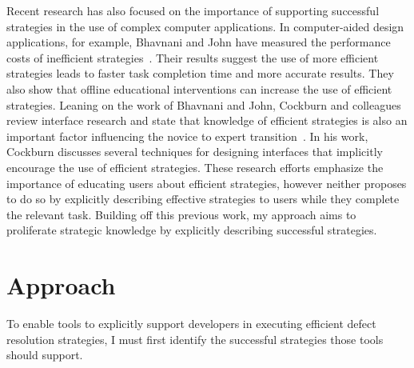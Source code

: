 \documentclass{sig-alternate}
\begin{document}
Recent research has also focused on the importance of supporting successful strategies in the use of complex computer applications.
In computer-aided design applications, for example, Bhavnani and John have measured the performance costs of inefficient strategies~\cite{Bhavnani2000}.
Their results suggest the use of more efficient strategies leads to faster task completion time and more accurate results.
They also show that offline educational interventions can increase the use of efficient strategies.
Leaning on the work of Bhavnani and John, Cockburn and colleagues review interface research and state that knowledge of efficient strategies is also an important factor influencing the novice to expert transition~\cite{Cockburn2014}.
In his work, Cockburn discusses several techniques for designing interfaces that implicitly encourage the use of efficient strategies.
These research efforts emphasize the importance of educating users about efficient strategies, however neither proposes to do so by explicitly describing effective strategies to users while they complete the relevant task.
Building off this previous work, my approach aims to proliferate strategic knowledge by explicitly describing successful strategies. 








 
 



\section{Approach}
\label{sec:approach}
To enable tools to explicitly support developers in executing efficient defect resolution strategies, I must first identify the successful strategies those tools should support. 
\end{document}

